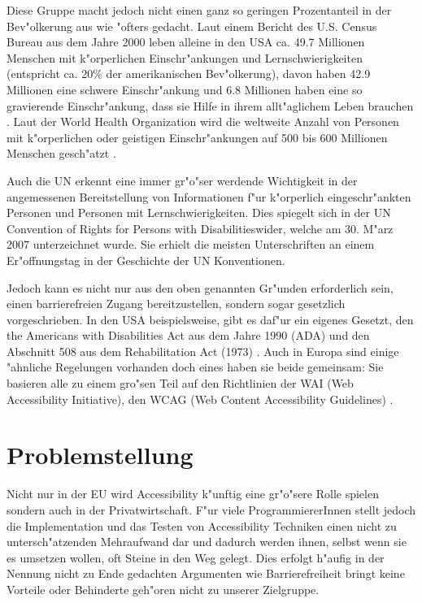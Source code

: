 \documentclass[a4paper,bibtotoc,oneside]{scrbook}
\begin{document}
Diese Gruppe macht jedoch nicht einen ganz so geringen Prozentanteil in der Bev"olkerung aus wie "ofters gedacht. Laut einem Bericht des U.S. Census Bureau aus dem Jahre 2000 leben alleine in den USA ca. 49.7 Millionen Menschen mit k"orperlichen Einschr"ankungen und Lernschwierigkeiten (entspricht ca. 20\% der amerikanischen Bev"olkerung), davon haben 42.9 Millionen eine schwere Einschr"ankung und 6.8 Millionen haben eine so gravierende Einschr"ankung, dass sie Hilfe in ihrem allt"aglichem Leben brauchen \cite[S. 1]{us_cens}. Laut der World Health Organization wird die weltweite Anzahl von Personen mit k"orperlichen oder geistigen Einschr"ankungen auf 500 bis 600 Millionen Menschen gesch"atzt \cite{who_dis}.

Auch die UN erkennt eine immer gr"o"ser werdende Wichtigkeit in der angemessenen Bereitstellung von Informationen f"ur k"orperlich eingeschr"ankten Personen und Personen mit Lernschwierigkeiten. Dies spiegelt sich in der \glqq UN Convention of Rights for Persons with Disabilities\grqq wider, welche am 30. M"arz 2007 unterzeichnet wurde. Sie erhielt die \glqq meisten Unterschriften an einem Er"offnungstag in der Geschichte der UN Konventionen\grqq \cite{un_disabilities}. 

Jedoch kann es nicht nur aus den oben genannten Gr"unden erforderlich sein,
einen barrierefreien Zugang bereitzustellen, sondern sogar gesetzlich
vorgeschrieben. In den USA beispielsweise, gibt es daf"ur ein eigenes
Gesetzt, den the Americans with Disabilities Act aus dem Jahre 1990 (ADA) und
den Abschnitt 508 aus dem Rehabilitation Act (1973) \cite[S. 288-289]{achieving_web_acc}. Auch in Europa sind einige "ahnliche Regelungen vorhanden \cite[S. 7]{mod_software} doch eines haben sie beide gemeinsam: Sie basieren alle zu einem gro"sen Teil auf den Richtlinien der WAI (Web Accessibility Initiative), den WCAG (Web Content Accessibility Guidelines) \cite[S. 289]{achieving_web_acc} \cite[S. 7]{mod_software}.

\section{Problemstellung}
Nicht nur in der EU wird Accessibility k"unftig eine gr"o"sere Rolle spielen \cite[Abschnitt EU]{w3c_pol} sondern auch in der Privatwirtschaft. F"ur viele ProgrammiererInnen stellt jedoch die Implementation und das Testen von Accessibility Techniken einen nicht zu untersch"atzenden Mehraufwand dar \cite[S. 27]{understand_acc} und dadurch werden ihnen, selbst wenn sie es umsetzen wollen, oft Steine in den Weg gelegt. Dies erfolgt h"aufig in der Nennung nicht zu Ende gedachten Argumenten wie \glqq Barrierefreiheit bringt keine Vorteile\grqq \cite[S. 28]{understand_acc} oder \glqq Behinderte geh"oren nicht zu unserer Zielgruppe\grqq \cite[S. 31]{understand_acc}.
\end{document}
